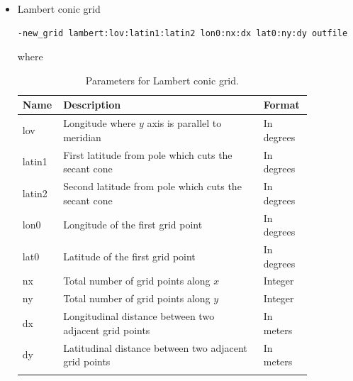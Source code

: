\documentclass[11pt,fleqn]{report}              %
\begin{document}
\begin{enumerate}
\begin{enumerate}
\begin{itemize}
\item Lambert conic grid
\lstset{language=bash}   
\begin{lstlisting}[frame=trBL]
-new_grid lambert:lov:latin1:latin2 lon0:nx:dx lat0:ny:dy outfile
\end{lstlisting}
where
{
\fontsize{10}{12}\selectfont
\begin{longtable}{p{0.08\linewidth} | p{0.65\linewidth} | p{0.12\linewidth} }
\hline
\hline
 Name & Description & Format \\
\hline
 lov & Longitude where $y$ axis is parallel to meridian & In degrees  \\
 latin1 & First latitude from pole which cuts the secant cone & In degrees \\
 latin2 & Second latitude from pole which cuts the secant cone & In degrees \\
 lon0 & Longitude of the first grid point & In degrees \\
 lat0 & Latitude of the first grid point & In degrees \\
 nx & Total number of grid points along $x$ & Integer \\
 ny & Total number of grid points along $y$ & Integer \\
 dx & Longitudinal distance between two adjacent grid points & In meters \\
 dy & Latitudinal distance between two adjacent grid points & In meters \\
\hline
\caption{Parameters for Lambert conic grid.}
\label{table:fv3grid_lambert}
\end{longtable}
}


\end{itemize}
\end{enumerate}
\end{enumerate}
\end{document}
